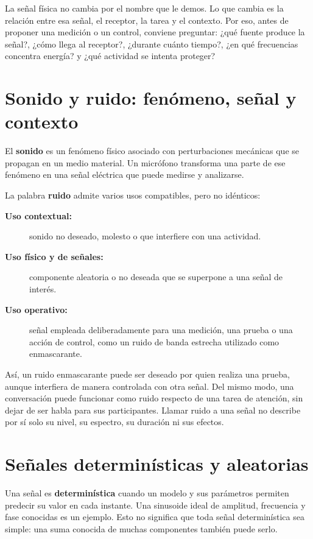 La señal física no cambia por el nombre que le demos. Lo que cambia es la
relación entre esa señal, el receptor, la tarea y el contexto. Por eso, antes
de proponer una medición o un control, conviene preguntar: ¿qué fuente produce
la señal?, ¿cómo llega al receptor?, ¿durante cuánto tiempo?, ¿en qué
frecuencias concentra energía? y ¿qué actividad se intenta proteger?

\section{Sonido y ruido: fenómeno, señal y contexto}
\label{sec:u10-sonido-ruido}

El \textbf{sonido} es un fenómeno físico asociado con perturbaciones mecánicas
que se propagan en un medio material. Un micrófono transforma una parte de ese
fenómeno en una señal eléctrica que puede medirse y analizarse.

La palabra \textbf{ruido} admite varios usos compatibles, pero no idénticos:
\begin{description}
    \item[\textbf{Uso contextual:}] sonido no deseado, molesto o que interfiere
    con una actividad.
    \item[\textbf{Uso físico y de señales:}] componente aleatoria o no deseada
    que se superpone a una señal de interés.
    \item[\textbf{Uso operativo:}] señal empleada deliberadamente para una
    medición, una prueba o una acción de control, como un ruido de banda
    estrecha utilizado como enmascarante.
\end{description}

Así, un ruido enmascarante puede ser deseado por quien realiza una prueba,
aunque interfiera de manera controlada con otra señal. Del mismo modo, una
conversación puede funcionar como ruido respecto de una tarea de atención,
sin dejar de ser habla para sus participantes. Llamar ruido a una señal no
describe por sí solo su nivel, su espectro, su duración ni sus efectos.

\section{Señales determinísticas y aleatorias}
\label{sec:u10-deterministicas-aleatorias}

Una señal es \textbf{determinística} cuando un modelo y sus parámetros permiten
predecir su valor en cada instante. Una sinusoide ideal de amplitud, frecuencia
y fase conocidas es un ejemplo. Esto no significa que toda señal
determinística sea simple: una suma conocida de muchas componentes también
puede serlo.

